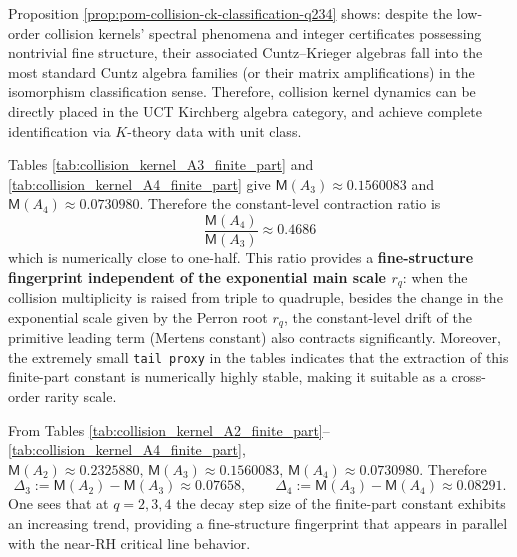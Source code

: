 \begin{remark}\label{rem:pom-collision-ck-standardization}
Proposition \ref{prop:pom-collision-ck-classification-q234} shows: despite the low-order collision kernels' spectral phenomena and integer certificates possessing nontrivial fine structure, their associated Cuntz--Krieger algebras fall into the most standard Cuntz algebra families (or their matrix amplifications) in the isomorphism classification sense.
Therefore, collision kernel dynamics can be directly placed in the UCT Kirchberg algebra category, and achieve complete identification via \(K\)-theory data with unit class.
\end{remark}

\begin{remark}\label{rem:pom-collision-mertens-halving}
Tables \ref{tab:collision_kernel_A3_finite_part} and \ref{tab:collision_kernel_A4_finite_part} give
\(
\mathsf{M}(A_3)\approx 0.1560083
\)
and
\(
\mathsf{M}(A_4)\approx 0.0730980
\).
Therefore the constant-level contraction ratio is
\[
\boxed{\;
\frac{\mathsf{M}(A_4)}{\mathsf{M}(A_3)}\approx 0.4686\;}
\]
 which is numerically close to one-half.
This ratio provides a \textbf{fine-structure fingerprint independent of the exponential main scale \(r_q\)}: when the collision multiplicity is raised from triple to quadruple,
besides the change in the exponential scale given by the Perron root \(r_q\), the constant-level drift of the primitive leading term (Mertens constant) also contracts significantly.
Moreover, the extremely small \texttt{tail proxy} in the tables indicates that the extraction of this finite-part constant is numerically highly stable, making it suitable as a cross-order rarity scale.
\end{remark}

\begin{remark}\label{rem:pom-collision-mertens-accel}
From Tables \ref{tab:collision_kernel_A2_finite_part}--\ref{tab:collision_kernel_A4_finite_part},
\(
\mathsf{M}(A_2)\approx 0.2325880,\,
\mathsf{M}(A_3)\approx 0.1560083,\,
\mathsf{M}(A_4)\approx 0.0730980
\).
Therefore
\[
\Delta_3:=\mathsf{M}(A_2)-\mathsf{M}(A_3)\approx 0.07658,\qquad
\Delta_4:=\mathsf{M}(A_3)-\mathsf{M}(A_4)\approx 0.08291.
\]
One sees that at \(q=2,3,4\) the decay step size of the finite-part constant exhibits an increasing trend, providing a fine-structure fingerprint that appears in parallel with the near-RH critical line behavior.

\end{remark}







